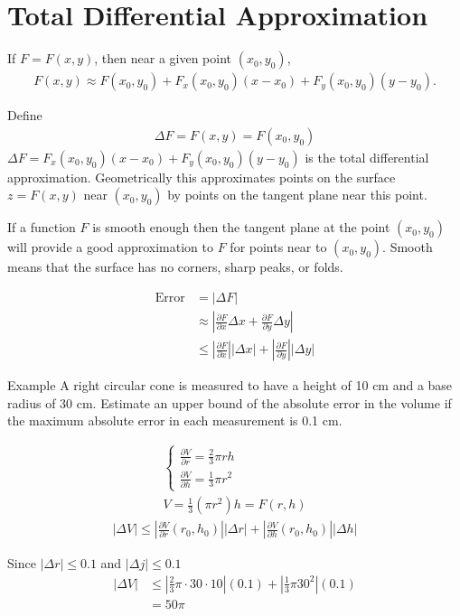 \documentclass{report}
\begin{document}
	\section{Total Differential Approximation}

		If $F = F(x,y)$, then near a given point $(x_0,y_0)$,
			\begin{align*}
				F(x,y) \approx F(x_0,y_0) + F_x(x_0,y_0)(x-x_0) + F_y(x_0,y_0)(y-y_0).
			\end{align*}

		Define
			\begin{align*}
				\Delta F = F(x,y) = F(x_0,y_0)
			\end{align*}
		$\Delta F = F_x(x_0,y_0)(x-x_0) + F_y(x_0,y_0)(y-y_0)$ is the total differential approximation. Geometrically this approximates points on the surface $z = F(x,y)$ near $(x_0,y_0)$ by points on the tangent plane near this point.

		If a function $F$ is smooth enough then the tangent plane at the point $(x_0,y_0)$ will provide a good approximation to $F$ for points near to $(x_0,y_0)$. Smooth means that the surface has no corners, sharp peaks, or folds.

		\begin{align*}
			\text{Error} &= |\Delta F|	\\
						 &\approx \left| \frac{\partial F}{\partial x} \Delta x + \frac{\partial F}{\partial y} \Delta y \right|	\\
						 &\leq \left|\frac{\partial F}{\partial x}\right| \left|\Delta x\right| + \left|\frac{\partial F}{\partial y}\right| \left|\Delta y\right|
		\end{align*}

		\begin{question}{Example}
			A right circular cone is measured to have a height of 10 cm and a base radius of 30 cm. Estimate an upper bound of the absolute error in the volume if the maximum absolute error in each measurement is 0.1 cm.

			\begin{align*}
				\begin{cases}
					\frac{\partial V}{\partial r} = \frac{2}{3} \pi r h	\\
					\frac{\partial V}{\partial h} = \frac{1}{3} \pi r^2
				\end{cases} \\
				V = \frac{1}{3}(\pi r^2)h = F(r,h)
			\end{align*}
			\begin{align*}
				\left| \Delta V\right| \leq \left|\frac{\partial V}{\partial r}(r_0,h_0) \right| \left|\Delta r\right| + \left|\frac{\partial V}{\partial h} (r_0,h_0)\right| \left|\Delta h \right|
			\end{align*}

			Since $|\Delta r| \leq 0.1$ and $|\Delta j| \leq 0.1$
			\begin{align*}
				|\Delta V| &\leq \left|\frac{2}{3} \pi \cdot 30 \cdot 10 \right|(0.1) + \left|\frac{1}{3} \pi 30^2 \right| (0.1)	\\
						   &= 50 \pi
			\end{align*}	
		\end{question}
\end{document}
